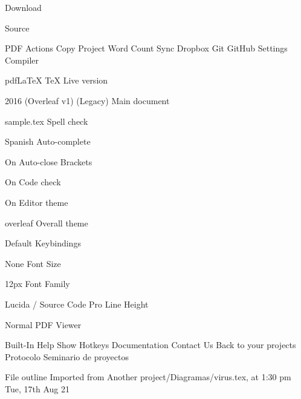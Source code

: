 Download

Source

PDF
Actions
   Copy Project
   Word Count
Sync
   Dropbox
   Git
   GitHub
Settings
Compiler

pdfLaTeX
TeX Live version

2016 (Overleaf v1) (Legacy)
Main document

sample.tex
Spell check

Spanish
Auto-complete

On
Auto-close Brackets

On
Code check

On
Editor theme

overleaf
Overall theme

Default
Keybindings

None
Font Size

12px
Font Family

Lucida / Source Code Pro
Line Height

Normal
PDF Viewer

Built-In
Help
   Show Hotkeys
   Documentation
   Contact Us
Back to your projects
Protocolo Seminario de proyectos

File outline
 Imported from Another project/Diagramas/virus.tex, at 1:30 pm Tue, 17th Aug 21

 



